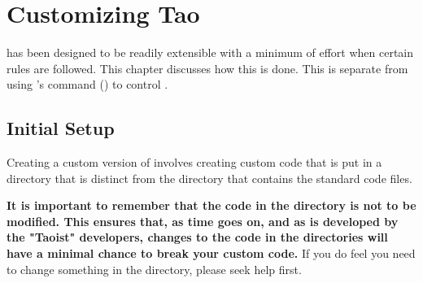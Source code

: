 \chapter{Customizing Tao}
\label{c:custom.tao}

\tao has been designed to be readily extensible with a minimum of effort when certain rules are
followed. This chapter discusses how this is done. This is separate from using \tao's 
command () to control \tao.

\section{Initial Setup}
\label{s:cust.init}

Creating a custom version of \tao involves creating custom code that is put in a directory that is
distinct from the  directory that contains the standard \tao code files.

\textbf{It is important to remember that the code in the  directory is not to be modified.
This ensures that, as time goes on, and as \tao is developed by the "Taoist" developers, changes to
the code in the  directories will have a minimal chance to break your custom code.} If you do
feel you need to change something in the  directory, please seek help first.


